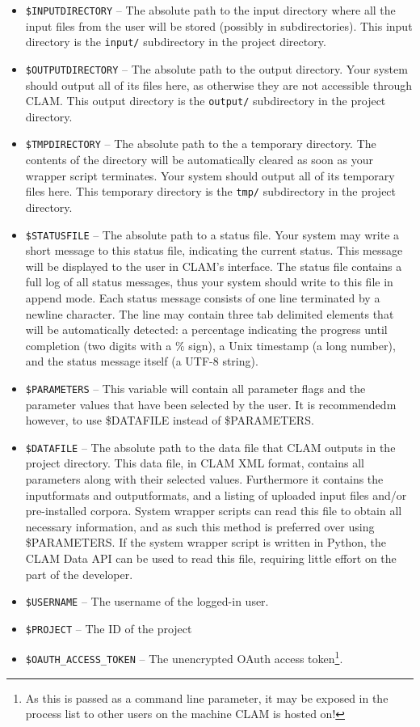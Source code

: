 \documentclass[a4paper,12pt,twoside,openright]{report}
\begin{document}
\begin{itemize}
\item \texttt{\$INPUTDIRECTORY} -- The absolute path to the input directory where all the input files from the user will be stored (possibly in subdirectories). This input directory is the \texttt{input/} subdirectory in the project directory.
\item \texttt{\$OUTPUTDIRECTORY} -- The absolute path to the output directory. Your system should output all of its files here, as otherwise they are not accessible through CLAM.  This output directory is the \texttt{output/} subdirectory in the project directory.
\item \texttt{\$TMPDIRECTORY} -- The absolute path to the a temporary
    directory. The contents of the directory will be automatically cleared as
    soon as your wrapper script terminates. Your system should output all of
    its temporary files here.  This temporary directory is the \texttt{tmp/} subdirectory in the project directory.
\item \texttt{\$STATUSFILE} -- The absolute path to a status file. Your system may write a short message to this status file, indicating the current status. This message will be displayed to the user in CLAM's interface. The status file contains a full log of all status messages, thus your system should write to this file in append mode. Each status message consists of one line terminated by a newline character. The line may contain three tab delimited elements that will be automatically detected: a percentage indicating the progress until completion (two digits with a \% sign), a Unix timestamp (a long number), and the status message itself (a UTF-8 string).
\item \texttt{\$PARAMETERS} -- This variable will contain all parameter flags
  and the parameter values that have been selected by the user. It is
  recommendedm however, to use \$DATAFILE instead of \$PARAMETERS.
\item \texttt{\$DATAFILE} -- The absolute path to the data file that CLAM outputs in the project directory. This data file, in CLAM XML format, contains all parameters along with their selected values. Furthermore it contains the inputformats and outputformats, and a listing of uploaded input files and/or pre-installed corpora. System wrapper scripts can read this file to obtain all necessary information, and as such this method is preferred over using \$PARAMETERS. If the system wrapper script is written in Python, the CLAM Data API can be used to read this file, requiring little effort on the part of the developer. 
\item \texttt{\$USERNAME} -- The username of the logged-in user.
\item \texttt{\$PROJECT} -- The ID of the project
\item \texttt{\$OAUTH\_ACCESS\_TOKEN} -- The unencrypted OAuth access token\footnote{As this is passed as a command line parameter, it may be exposed in the process list to other users on the machine CLAM is hosted on!}.
\end{itemize}
\end{document}
